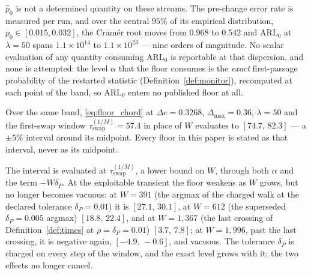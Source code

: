 \begin{remark}\label{rem:floor_band}
  $\hat p_0$ is not a determined quantity on these streams. The pre-change
  error rate is measured per run, and over the central $95\%$ of its empirical
  distribution, $p_0 \in [0.015, 0.032]$, the Cram\'er root moves from $0.968$
  to $0.542$ and $\mathrm{ARL}_0$ at $\lambda = 50$ spans $1.1\times10^{14}$
  to $1.1\times10^{23}$ --- nine orders of magnitude. No scalar evaluation of
  any quantity consuming $\mathrm{ARL}_0$ is reportable at that dispersion,
  and none is attempted: the level $\alpha$ that the floor consumes is the
  \emph{exact} first-passage probability of the restarted statistic
  (Definition~\ref{def:monitor}), recomputed at each point of the band, so
  $\mathrm{ARL}_0$ enters no published floor at all.

  Over the same band, \eqref{eq:floor_chord} at $\Delta e = 0.3268$,
  $\Delta_{\max} = 0.36$, $\lambda = 50$ and the first-swap window
  $\tau_{\mathrm{swap}}^{(1/M)} = 57.4$ in place of $W$ evaluates to
  $[74.7,\, 82.3]$ --- a $\pm 5\%$ interval around its midpoint. Every
  floor in this paper is stated as that interval, never as its midpoint.

  The interval is evaluated at $\tau_{\mathrm{swap}}^{(1/M)}$, a lower bound
  on $W$, through both $\alpha$ and the term $-W\delta_P$. At the exploitable
  transient the floor weakens as $W$ grows, but no longer becomes vacuous:
  at $W = 391$ (the argmax of the charged walk at the declared tolerance
  $\delta_P = 0.01$) it is $[27.1,\, 30.1]$, at $W = 612$ (the superseded
  $\delta_P = 0.005$ argmax) $[18.8,\, 22.4]$, and at $W = 1{,}367$ (the last
  crossing of Definition~\ref{def:times} at $\rho = \delta_P = 0.01$)
  $[3.7,\, 7.8]$; at $W = 1{,}996$, past the last crossing, it is negative
  again, $[-4.9,\, -0.6]$, and vacuous. The tolerance $\delta_P$ is charged
  on every step of the window, and the exact level grows with it; the two
  effects no longer cancel.
\end{remark}


